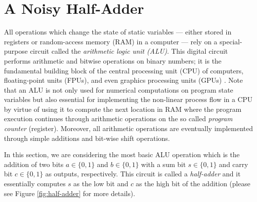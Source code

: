 \section{A Noisy Half-Adder}
\label{sec:noisy-half-adder}
All operations which change the state of static variables --- either stored in registers or random-access memory (RAM) in a computer --- rely on a special-purpose circuit called the {\em arithmetic logic unit (ALU)}. This digital circuit performs arithmetic and bitwise operations on binary numbers; it is the fundamental building block of the central processing unit (CPU) of computers, floating-point units (FPUs), and even graphics processing units (GPUs) \cite{HamVraZak2012i}. Note that an ALU is not only used for numerical computations on program state variables but also essential for implementing the non-linear process flow in a CPU by virtue of using it to compute the next location in RAM where the program execution continues through arithmetic operations on the so called {\em program counter} (register). Moreover, all arithmetic operations are eventually implemented through simple additions and bit-wise shift operations.

In this section, we are considering the most basic ALU operation which is the addition of two bits $a \in \{0,1\}$ and $b \in \{0,1\}$ with a sum bit $s \in \{0,1\}$ and carry bit $c \in \{0,1\}$ as outputs, respectively. This circuit is called a {\em half-adder} and it essentially computes $s$ as the low bit and $c$ as the high bit of the addition (please see Figure \ref{fig:half-adder} for more details).

